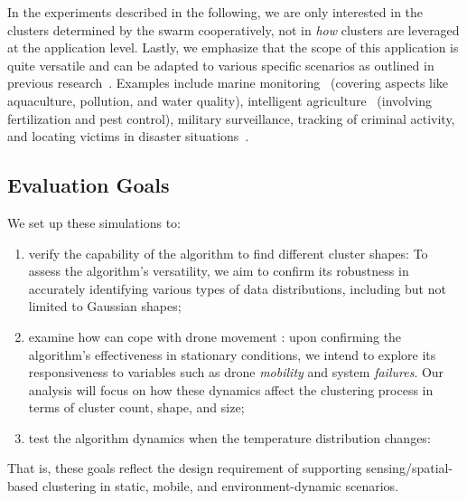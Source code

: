 In the experiments described in the following,
 we are only interested in the clusters determined by the swarm cooperatively,
 not in \emph{how} clusters are leveraged at the application level.
%
Lastly, we emphasize that the scope of this application is quite versatile and can be adapted to various specific scenarios as outlined in previous research~\cite{DBLP:journals/firai/SchranzUSE20}. 
 Examples include marine monitoring~\cite{Farinelli2017-ic} 
 (covering aspects like aquaculture, pollution, and water quality), 
 intelligent agriculture~\cite{DBLP:conf/fsr/BallREPUFSWC13} (involving fertilization and pest control), 
 military surveillance, tracking of criminal activity, and 
 locating victims in disaster situations~\cite{Saez-Pons2010-hh}.
\subsection{Evaluation Goals}\label{s:eval-goal}
We set up these simulations to:
\begin{enumerate}%
\item \label{goal:1} verify the capability of the algorithm to find different cluster shapes: To assess the algorithm's versatility, we aim to confirm its robustness in accurately identifying various types of data distributions, including but not limited to Gaussian shapes;
\item \label{goal:2} examine how  can cope with drone movement :
  upon confirming the algorithm's effectiveness in stationary conditions, we intend to explore its responsiveness to variables such as drone \emph{mobility} and system \emph{failures}. 
  Our analysis will focus on how these dynamics affect the clustering process in terms of cluster count, shape, and size;
 \item \label{goal:3} test the algorithm dynamics when the temperature distribution changes:
\end{enumerate}
%
That is, these goals reflect
 the design requirement of
 supporting
 sensing/spatial-based clustering
 in static, mobile, and environment-dynamic scenarios.

